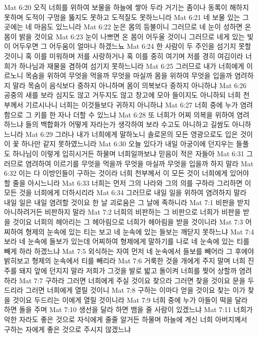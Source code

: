 Mat 6:20  오직 너희를 위하여 보물을 하늘에 쌓아 두라 거기는 좀이나 동록이 해하지 못하며 도적이 구멍을 뚫지도 못하고 도적질도 못하느니라
Mat 6:21  네 보물 있는 그 곳에는 네 마음도 있느니라
Mat 6:22  눈은 몸의 등불이니 그러므로 네 눈이 성하면 온 몸이 밝을 것이요
Mat 6:23  눈이 나쁘면 온 몸이 어두울 것이니 그러므로 네게 있는 빛이 어두우면 그 어두움이 얼마나 하겠느뇨
Mat 6:24  한 사람이 두 주인을 섬기지 못할 것이니 혹 이를 미워하며 저를 사랑하거나 혹 이를 중히 여기며 저를 경히 여김이라 너희가 하나님과 재물을 겸하여 섬기지 못하느니라
Mat 6:25  그러므로 내가 너희에게 이르노니 목숨을 위하여 무엇을 먹을까 무엇을 마실까 몸을 위하여 무엇을 입을까 염려하지 말라 목숨이 음식보다 중하지 아니하며 몸이 의복보다 중하지 아니하냐
Mat 6:26  공중의 새를 보라 심지도 않고 거두지도 않고 창고에 모아 들이지도 아니하되 너희 천부께서 기르시나니 너희는 이것들보다 귀하지 아니하냐
Mat 6:27  너희 중에 누가 염려함으로 그 키를 한 자나 더할 수 있느냐
Mat 6:28  또 너희가 어찌 의복을 위하여 염려하느냐 들의 백합화가 어떻게 자라는가 생각하여 보라 수고도 아니하고 길쌈도 아니하느니라
Mat 6:29  그러나 내가 너희에게 말하노니 솔로몬의 모든 영광으로도 입은 것이 이 꽃 하나만 같지 못하였느니라
Mat 6:30  오늘 있다가 내일 아궁이에 던지우는 들풀도 하나님이 이렇게 입히시거든 하물며 너희일까보냐 믿음이 적은 자들아
Mat 6:31  그러므로 염려하여 이르기를 무엇을 먹을까 무엇을 마실까 무엇을 입을까 하지 말라
Mat 6:32  이는 다 이방인들이 구하는 것이라 너희 천부께서 이 모든 것이 너희에게 있어야 할 줄을 아시느니라
Mat 6:33  너희는 먼저 그의 나라와 그의 의를 구하라 그리하면 이 모든 것을 너희에게 더하시리라
Mat 6:34  그러므로 내일 일을 위하여 염려하지 말라 내일 일은 내일 염려할 것이요 한 날 괴로움은 그 날에 족하니라
Mat 7:1  비판을 받지 아니하려거든 비판하지 말라
Mat 7:2  너희의 비판하는 그 비판으로 너희가 비판을 받을 것이요 너희의 헤아리는 그 헤아림으로 너희가 헤아림을 받을 것이니라
Mat 7:3  어찌하여 형제의 눈속에 있는 티는 보고 네 눈속에 있는 들보는 깨닫지 못하느냐
Mat 7:4  보라 네 눈속에 들보가 있는데 어찌하여 형제에게 말하기를 나로 네 눈속에 있는 티를 빼게 하라 하겠느냐
Mat 7:5  외식하는 자여 먼저 네 눈속에서 들보를 빼어라 그 후에야 밝히보고 형제의 눈속에서 티를 빼리라
Mat 7:6  거룩한 것을 개에게 주지 말며 너희 진주를 돼지 앞에 던지지 말라 저희가 그것을 발로 밟고 돌이켜 너희를 찢어 상할까 염려하라
Mat 7:7  구하라 그러면 너희에게 주실 것이요 찾으라 그러면 찾을 것이요 문을 두드리라 그러면 너희에게 열릴 것이니
Mat 7:8  구하는 이마다 얻을 것이요 찾는 이가 찾을 것이요 두드리는 이에게 열릴 것이니라
Mat 7:9  너희 중에 누가 아들이 떡을 달라 하면 돌을 주며
Mat 7:10  생선을 달라 하면 뱀을 줄 사람이 있겠느냐
Mat 7:11  너희가 악한 자라도 좋은 것으로 자식에게 줄줄 알거든 하물며 하늘에 계신 너희 아버지께서 구하는 자에게 좋은 것으로 주시지 않겠느냐
